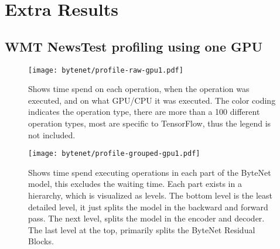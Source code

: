 \chapter{Extra Results}

\section{WMT NewsTest profiling using one GPU}
\label{appendix:result:bytenet-profile}

\begin{figure}[h]
    \centering
    \texttt{[image: bytenet/profile-raw-gpu1.pdf]}
    \caption{Shows time spend on each operation, when the operation was executed, and on what GPU/CPU it was executed. The color coding indicates the operation type, there are more than a 100 different operation types, most are specific to TensorFlow, thus the legend is not included.}
\end{figure}

\begin{figure}[h]
    \centering
    \texttt{[image: bytenet/profile-grouped-gpu1.pdf]}
    \caption{Shows time spend executing operations in each part of the ByteNet model, this excludes the waiting time. Each part exists in a hierarchy, which is visualized as levels. The bottom level is the least detailed level, it just splits the model in the backward and forward pass. The next level, splits the model in the encoder and decoder. The last level at the top, primarily splits the ByteNet Residual Blocks.}
\end{figure}
